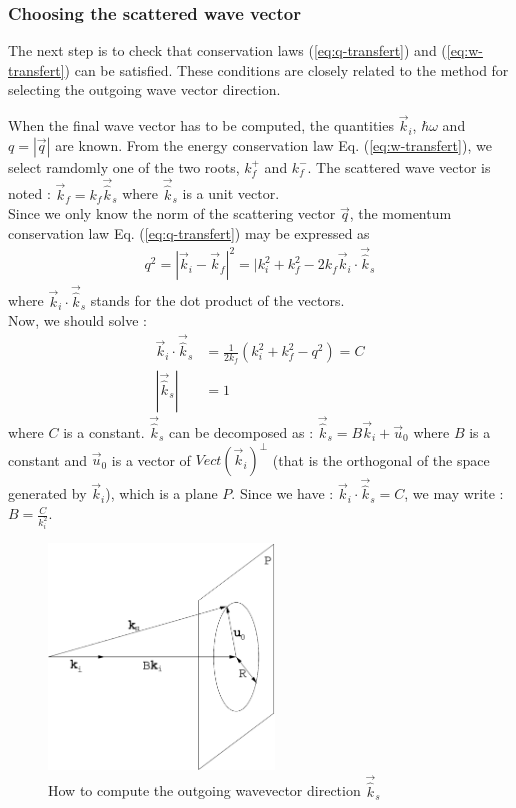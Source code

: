 \subsubsection{Choosing the scattered wave vector}

The next step is to check that conservation laws (\ref{eq:q-transfert}) and (\ref{eq:w-transfert}) can be satisfied. These conditions are closely related to the method for selecting the outgoing wave vector direction.

When the final wave vector has to be computed, the quantities $\vec{k}_i$, $\hbar \omega$ and $q = |\vec{q}|$ are known.
From the energy conservation law Eq. (\ref{eq:w-transfert}), we select ramdomly one of the two roots, $k_f^+$ and $k_f^-$.
The scattered wave vector is noted : $\vec{k}_f = k_f \vec{\hat k}_s$ where $\vec{\hat k}_s$ is a unit vector.\\
Since we only know the norm of the scattering vector $\vec{q}$, the momentum conservation law Eq. (\ref{eq:q-transfert}) may be expressed as
\begin{align}
q^2 = |\vec{k}_i -\vec{k}_f|^2 = |k_i^2 + k_f^2 - 2 k_f \vec{k}_i \cdot \vec{\hat k}_s
\end{align}
where $\vec{k}_i \cdot \vec{\hat k}_s$ stands for the dot product of the vectors.\\
Now, we should solve :
\begin{align}
\vec{k}_i \cdot \vec{\hat k}_s &= \frac{1}{2k_f} (k_i^2 + k_f^2 - q^2) = C \\
|\vec{\hat k}_s| &= 1
\end{align}
where $C$ is a constant.
$\vec{\hat k}_s$ can be decomposed as : $\vec{\hat k}_s = B \vec{k}_i + \vec{u}_0$ where $B$ is a constant and $\vec{u}_0$ is a vector of $Vect(\vec{k}_i)^{\bot}$ (that is the orthogonal of the space generated by $\vec{k}_i$), which is a plane $P$.
Since we have : $\vec{k}_i \cdot \vec{\hat k}_s = C$, we may write : $B = \frac{C}{k_i^2}$.
\begin{figure}[!h]
\begin{center}
\includegraphics*[height=6cm]{figures/calckf_2.eps}
\caption{How to compute the outgoing wavevector direction $\vec{\hat k}_s$}
\label{fig:ann_kf}
\end{center}
\end{figure}
